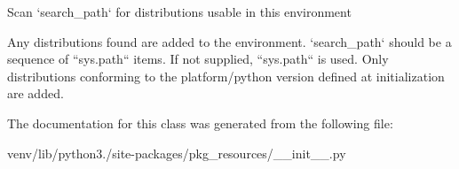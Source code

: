 \begin{DoxyVerb}Scan `search_path` for distributions usable in this environment

Any distributions found are added to the environment.
`search_path` should be a sequence of ``sys.path`` items.  If not
supplied, ``sys.path`` is used.  Only distributions conforming to
the platform/python version defined at initialization are added.
\end{DoxyVerb}
 

The documentation for this class was generated from the following file\+:\begin{DoxyCompactItemize}
\item 
venv/lib/python3./site-\/packages/pkg\+\_\+resources/\+\_\+\+\_\+init\+\_\+\+\_\+.\+py\end{DoxyCompactItemize}
